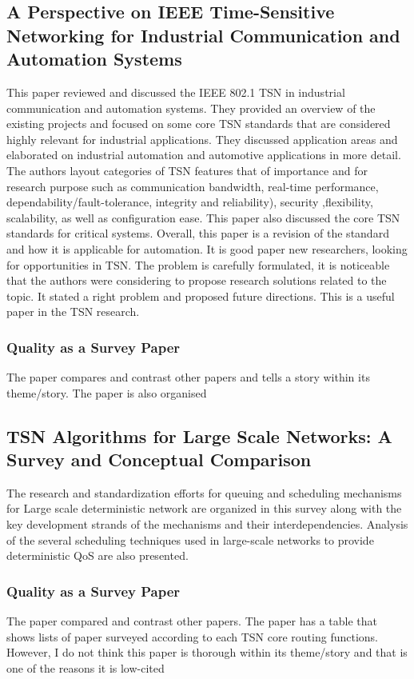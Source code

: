 \documentclass{article}
\begin{document}
\subsection{A Perspective on IEEE
Time-Sensitive Networking
for Industrial Communication
and Automation Systems}
This paper \cite{bello2019perspective} reviewed and discussed the IEEE
802.1 TSN in industrial communication and automation
systems. They provided an overview of the existing projects
and focused on some
core TSN standards that are  considered highly relevant for
industrial applications. They discussed application areas and elaborated on industrial automation and
automotive applications in more detail. 
The authors layout categories of TSN features that of importance and for research purpose such as  communication bandwidth, real-time performance, dependability/fault-tolerance, integrity and reliability), security ,flexibility, scalability, as well as configuration ease.  This paper also discussed the core TSN standards for critical systems. Overall, this paper is a revision of the standard and how it is applicable for automation. It is good paper new researchers, looking for opportunities in TSN.
The problem is carefully formulated, it is noticeable that the authors were considering to propose research solutions related to the topic. It stated a right problem and proposed future directions. This is a useful paper in the TSN research.
\subsubsection{Quality as a Survey Paper}
The paper compares and contrast other papers and tells a story within its theme/story. The paper is also organised


\subsection{TSN Algorithms for Large Scale Networks: A
Survey and Conceptual Comparison }
The research and standardization efforts for queuing and scheduling mechanisms for Large scale deterministic network are organized in this survey \cite{nasrallah2019tsn} along with the key development strands of the mechanisms and their interdependencies. Analysis of the several scheduling techniques used in large-scale networks to provide deterministic QoS are also presented. 
\subsubsection{Quality as a Survey Paper}
The paper compared and contrast other papers.
The paper has  a table that shows lists of paper surveyed according to each TSN core routing functions.  However, I do not think this paper is thorough within its theme/story and that is one of the reasons it  is low-cited
\end{document}
